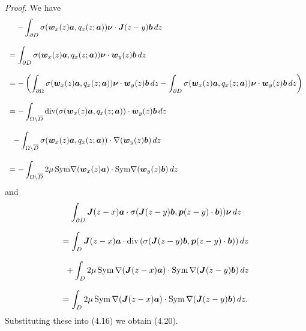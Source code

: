 {\it\noindent Proof.}
We have
$$\begin{array}{l}
\displaystyle
\,\,\,\,\,\,
-\int_{\partial D}
\sigma(\mbox{\boldmath $w$}_x(z)\mbox{\boldmath $a$},q_x(z;\mbox{\boldmath $a$}))\mbox{\boldmath $\nu$}\cdot
\mbox{\boldmath $J$}(z-y)\mbox{\boldmath $b$}\,dz
\\
\\
\displaystyle
=\int_{\partial D}
\sigma(\mbox{\boldmath $w$}_x(z)\mbox{\boldmath $a$},q_x(z;\mbox{\boldmath $a$}))\mbox{\boldmath $\nu$}\cdot
\mbox{\boldmath $w$}_y(z)\mbox{\boldmath $b$}\,dz
\\
\\
\displaystyle
=-
\left(
\int_{\partial\Omega}\sigma(\mbox{\boldmath $w$}_x(z)\mbox{\boldmath $a$},q_x(z;\mbox{\boldmath $a$}))\mbox{\boldmath $\nu$}\cdot
\mbox{\boldmath $w$}_y(z)\mbox{\boldmath $b$}\,dz
-\int_{\partial D}\sigma(\mbox{\boldmath $w$}_x(z)\mbox{\boldmath $a$},q_x(z;\mbox{\boldmath $a$}))\mbox{\boldmath $\nu$}\cdot
\mbox{\boldmath $w$}_y(z)\mbox{\boldmath $b$}\,dz
\right)
\\
\\
\displaystyle
=-\int_{\Omega\setminus\overline{D}}
\text{div}(\sigma(\mbox{\boldmath $w$}_x(z)\mbox{\boldmath $a$},q_x(z;\mbox{\boldmath $a$}))\cdot
\mbox{\boldmath $w$}_y(z)\mbox{\boldmath $b$}\,dz\\
\\
\displaystyle
\,\,\,
-\int_{\Omega\setminus\overline{D}}\sigma(\mbox{\boldmath $w$}_x(z)\mbox{\boldmath $a$},q_x(z;\mbox{\boldmath $a$}))
\cdot\nabla(\mbox{\boldmath $w$}_y(z)\mbox{\boldmath $b$})\,dz
\\
\\
\displaystyle
=-\int_{\Omega\setminus\overline{D}}2\mu\,\text{Sym}\nabla(\mbox{\boldmath $w$}_x(z)\mbox{\boldmath $a$})
\cdot\text{Sym}\nabla(\mbox{\boldmath $w$}_y(z)\mbox{\boldmath $b$})\,dz
\end{array}
$$
and 
$$\begin{array}{l}
\displaystyle
\,\,\,\,\,\,
\int_{\partial D}
\mbox{\boldmath $J$}(z-x)\mbox{\boldmath $a$}\cdot
\sigma(\mbox{\boldmath $J$}(z-y)\mbox{\boldmath $b$},
\mbox{\boldmath $p$}(z-y)\cdot\mbox{\boldmath $b$}))\mbox{\boldmath $\nu$}
\,dz
\\
\\
\displaystyle
=\int_{D}\mbox{\boldmath $J$}(z-x)\mbox{\boldmath $a$}\cdot
\text{div}\,(\sigma(\mbox{\boldmath $J$}(z-y)\mbox{\boldmath $b$},
\mbox{\boldmath $p$}(z-y)\cdot\mbox{\boldmath $b$}))\,dz
\\
\\
\displaystyle
\,\,\,
+\int_D2\mu\,\text{Sym}\,\nabla(\mbox{\boldmath $J$}(z-x)\mbox{\boldmath $a$})
\cdot
\text{Sym}\,\nabla(\mbox{\boldmath $J$}(z-y)\mbox{\boldmath $b$})
\,dz
\\
\\
\displaystyle
=\int_D2\mu\,\text{Sym}\,\nabla(\mbox{\boldmath $J$}(z-x)\mbox{\boldmath $a$})
\cdot
\text{Sym}\,\nabla(\mbox{\boldmath $J$}(z-y)\mbox{\boldmath $b$})
\,dz.
\end{array}
$$
Substituting these into (4.16) we obtain (4.20).


